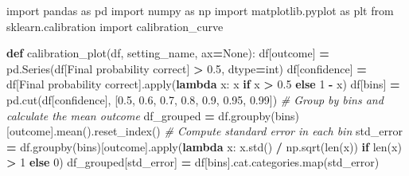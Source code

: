 \documentclass[
]{article}
\newenvironment{Shaded}{\begin{snugshade}}{\end{snugshade}}
\newcommand{\BuiltInTok}[1]{#1}
\newcommand{\CommentTok}[1]{\textcolor[rgb]{0.56,0.35,0.01}{\textit{#1}}}
\newcommand{\ControlFlowTok}[1]{\textcolor[rgb]{0.13,0.29,0.53}{\textbf{#1}}}
\newcommand{\DecValTok}[1]{\textcolor[rgb]{0.00,0.00,0.81}{#1}}
\newcommand{\FloatTok}[1]{\textcolor[rgb]{0.00,0.00,0.81}{#1}}
\newcommand{\ImportTok}[1]{#1}
\newcommand{\KeywordTok}[1]{\textcolor[rgb]{0.13,0.29,0.53}{\textbf{#1}}}
\newcommand{\NormalTok}[1]{#1}
\newcommand{\OperatorTok}[1]{\textcolor[rgb]{0.81,0.36,0.00}{\textbf{#1}}}
\newcommand{\StringTok}[1]{\textcolor[rgb]{0.31,0.60,0.02}{#1}}
\newcommand{\VariableTok}[1]{\textcolor[rgb]{0.00,0.00,0.00}{#1}}
\begin{document}
\begin{Shaded}
\begin{Highlighting}[]
\ImportTok{import}\NormalTok{ pandas }\ImportTok{as}\NormalTok{ pd}
\ImportTok{import}\NormalTok{ numpy }\ImportTok{as}\NormalTok{ np}
\ImportTok{import}\NormalTok{ matplotlib.pyplot }\ImportTok{as}\NormalTok{ plt}
\ImportTok{from}\NormalTok{ sklearn.calibration }\ImportTok{import}\NormalTok{ calibration\_curve}

\KeywordTok{def}\NormalTok{ calibration\_plot(df, setting\_name, ax}\OperatorTok{=}\VariableTok{None}\NormalTok{):}
\NormalTok{    df[}\StringTok{\textquotesingle{}outcome\textquotesingle{}}\NormalTok{] }\OperatorTok{=}\NormalTok{ pd.Series(df[}\StringTok{\textquotesingle{}Final probability correct\textquotesingle{}}\NormalTok{] }\OperatorTok{\textgreater{}} \FloatTok{0.5}\NormalTok{, dtype}\OperatorTok{=}\BuiltInTok{int}\NormalTok{)}
\NormalTok{    df[}\StringTok{\textquotesingle{}confidence\textquotesingle{}}\NormalTok{] }\OperatorTok{=}\NormalTok{ df[}\StringTok{\textquotesingle{}Final probability correct\textquotesingle{}}\NormalTok{].}\BuiltInTok{apply}\NormalTok{(}\KeywordTok{lambda}\NormalTok{ x: x }\ControlFlowTok{if}\NormalTok{ x }\OperatorTok{\textgreater{}} \FloatTok{0.5} \ControlFlowTok{else} \DecValTok{1} \OperatorTok{{-}}\NormalTok{ x)}
\NormalTok{    df[}\StringTok{\textquotesingle{}bins\textquotesingle{}}\NormalTok{] }\OperatorTok{=}\NormalTok{ pd.cut(df[}\StringTok{\textquotesingle{}confidence\textquotesingle{}}\NormalTok{], [}\FloatTok{0.5}\NormalTok{, }\FloatTok{0.6}\NormalTok{, }\FloatTok{0.7}\NormalTok{, }\FloatTok{0.8}\NormalTok{, }\FloatTok{0.9}\NormalTok{, }\FloatTok{0.95}\NormalTok{, }\FloatTok{0.99}\NormalTok{])}
    \CommentTok{\# Group by bins and calculate the mean outcome}
\NormalTok{    df\_grouped }\OperatorTok{=}\NormalTok{ df.groupby(}\StringTok{\textquotesingle{}bins\textquotesingle{}}\NormalTok{)[}\StringTok{\textquotesingle{}outcome\textquotesingle{}}\NormalTok{].mean().reset\_index()}
    \CommentTok{\# Compute standard error in each bin}
\NormalTok{    std\_error }\OperatorTok{=}\NormalTok{ df.groupby(}\StringTok{\textquotesingle{}bins\textquotesingle{}}\NormalTok{)[}\StringTok{\textquotesingle{}outcome\textquotesingle{}}\NormalTok{].}\BuiltInTok{apply}\NormalTok{(}\KeywordTok{lambda}\NormalTok{ x: x.std() }\OperatorTok{/}\NormalTok{ np.sqrt(}\BuiltInTok{len}\NormalTok{(x)) }\ControlFlowTok{if} \BuiltInTok{len}\NormalTok{(x) }\OperatorTok{\textgreater{}} \DecValTok{1} \ControlFlowTok{else} \DecValTok{0}\NormalTok{)}
\NormalTok{    df\_grouped[}\StringTok{\textquotesingle{}std\_error\textquotesingle{}}\NormalTok{] }\OperatorTok{=}\NormalTok{ df[}\StringTok{\textquotesingle{}bins\textquotesingle{}}\NormalTok{].cat.categories.}\BuiltInTok{map}\NormalTok{(std\_error)}

\end{Highlighting}
\end{Shaded}
\end{document}
